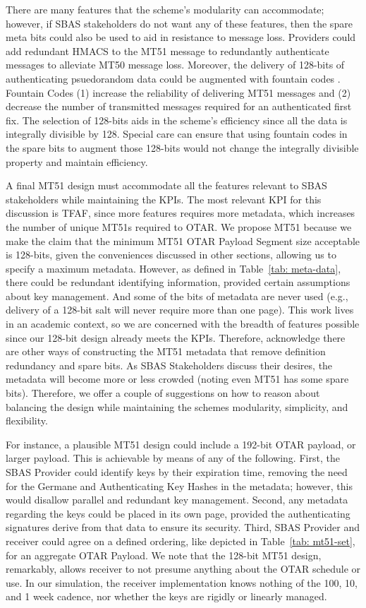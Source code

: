 \documentclass[APA,STIX1COL]{IONjournal/ION-APA Template}
\begin{document}
		There are many features that the scheme's modularity can accommodate; however, if SBAS stakeholders do not want any of these features, then the spare meta bits could also be used to aid in resistance to message loss.
		Providers could add redundant HMACS to the MT51 message to redundantly authenticate messages to alleviate MT50 message loss.
		Moreover, the delivery of 128-bits of authenticating psuedorandom data could be augmented with fountain codes \cite{gnss_fountain_codes}.
		Fountain Codes (1) increase the reliability of delivering MT51 messages and (2) decrease the number of transmitted messages required for an authenticated first fix.
		The selection of 128-bits aids in the scheme's efficiency since all the data is integrally divisible by 128.
		Special care can ensure that using fountain codes in the spare bits to augment those 128-bits would not change the integrally divisible property and maintain efficiency.

		A final MT51 design must accommodate all the features relevant to SBAS stakeholders while maintaining the KPIs.
		The most relevant KPI for this discussion is TFAF, since more features requires more metadata, which increases the number of unique MT51s required to OTAR.
		We propose MT51 because we make the claim that the minimum MT51 OTAR Payload Segment size acceptable is 128-bits, given the conveniences discussed in other sections, allowing us to specify a maximum metadata.
		However, as defined in Table~\ref{tab: meta-data}, there could be redundant identifying information, provided certain assumptions about key management.
		And some of the bits of metadata are never used (e.g., delivery of a 128-bit salt will never require more than one page).
		This work lives in an academic context, so we are concerned with the breadth of features possible since our 128-bit design already meets the KPIs.
		Therefore, acknowledge there are other ways of constructing the MT51 metadata that remove definition redundancy and spare bits.
		As SBAS Stakeholders discuss their desires, the metadata will become more or less crowded (noting even MT51 has some spare bits).
		Therefore, we offer a couple of suggestions on how to reason about balancing the design while maintaining the schemes modularity, simplicity, and flexibility.

		For instance, a plausible MT51 design could include a 192-bit OTAR payload, or larger payload.
		This is achievable by means of any of the following.
		First, the SBAS Provider could identify keys by their expiration time, removing the need for the Germane and Authenticating Key Hashes in the metadata; however, this would disallow parallel and redundant key management.
		Second, any metadata regarding the keys could be placed in its own page, provided the authenticating signatures derive from that data to ensure its security.
		Third, SBAS Provider and receiver could agree on a defined ordering, like depicted in Table~\ref{tab: mt51-set}, for an aggregate OTAR Payload.
		We note that the 128-bit MT51 design, remarkably, allows receiver to not presume anything about the OTAR schedule or use.
		In our simulation, the receiver implementation knows nothing of the 100, 10, and 1 week cadence, nor whether the keys are rigidly or linearly managed.
\end{document}
